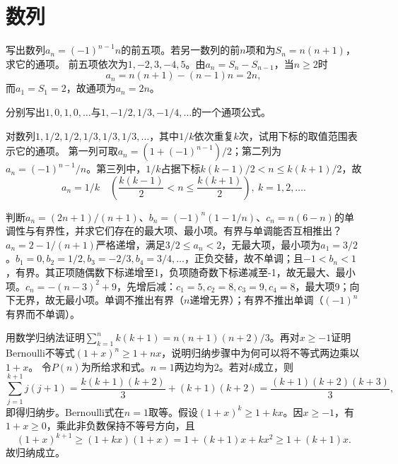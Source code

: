\par\addvspace{12pt}

\section{数列}

\label{sol:sec:analysis:1}

写出数列\(a_n=(-1)^{n-1}n\)的前五项。若另一数列的前\(n\)项和为\(S_n=n(n+1)\)，求它的通项。
\solutionanswer
前五项依次为\(1,-2,3,-4,5\)。由\(a_n=S_n-S_{n-1}\)，当\(n\ge2\)时
\[a_n=n(n+1)-(n-1)n=2n,\]
而\(a_1=S_1=2\)，故通项为\(a_n=2n\)。


分别写出\(1,0,1,0,\ldots\)与\(1,-1/2,1/3,-1/4,\ldots\)的一个通项公式。

对数列\(1,1/2,1/2,1/3,1/3,1/3,\ldots\)，其中\(1/k\)依次重复\(k\)次，试用下标的取值范围表示它的通项。
\solutionanswer
第一列可取\(a_n=(1+(-1)^{n-1})/2\)；第二列为\(a_n=(-1)^{n-1}/n\)。第三列中，\(1/k\)占据下标\(k(k-1)/2<n\le k(k+1)/2\)，故\[a_n=1/k\quad\left(\frac{k(k-1)}2<n\le\frac{k(k+1)}2\right),\ k=1,2,\ldots.\]


判断\(a_n=(2n+1)/(n+1)\)、\(b_n=(-1)^n(1-1/n)\)、\(c_n=n(6-n)\)的单调性与有界性，并求它们存在的最大项、最小项。有界与单调能否互相推出？
\solutionanswer
\(a_n=2-1/(n+1)\)严格递增，满足\(3/2\le a_n<2\)，无最大项，最小项为\(a_1=3/2\)。\(b_1=0,b_2=1/2,b_3=-2/3,b_4=3/4,\ldots\)，正负交替，故不单调；且\(-1<b_n<1\)，有界。其正项随偶数下标递增至1，负项随奇数下标递减至-1，故无最大、最小项。\(c_n=-(n-3)^2+9\)，先增后减：\(c_1=5,c_2=8,c_3=9,c_4=8\)，最大项9；向下无界，故无最小项。单调不推出有界（\(n\)递增无界）；有界不推出单调（\((-1)^n\)有界而不单调）。


用数学归纳法证明\(\sum_{k=1}^n k(k+1)=n(n+1)(n+2)/3\)。再对\(x\ge-1\)证明Bernoulli不等式\((1+x)^n\ge1+nx\)，说明归纳步骤中为何可以将不等式两边乘以\(1+x\)。
\solutionanswer
令\(P(n)\)为所给求和式。\(n=1\)两边均为2。若对\(k\)成立，则
\[\sum_{j=1}^{k+1}j(j+1)=\frac{k(k+1)(k+2)}3+(k+1)(k+2)=\frac{(k+1)(k+2)(k+3)}3,\]
即得归纳步。Bernoulli式在\(n=1\)取等。假设\((1+x)^k\ge1+kx\)。因\(x\ge-1\)，有\(1+x\ge0\)，乘此非负数保持不等号方向，且
\[(1+x)^{k+1}\ge(1+kx)(1+x)=1+(k+1)x+kx^2\ge1+(k+1)x.\]
故归纳成立。


